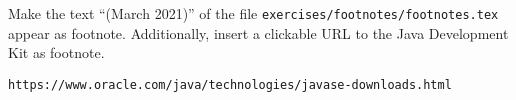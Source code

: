 Make the text \enquote{(March 2021)} of the file \texttt{exercises/footnotes/footnotes.tex} appear as footnote. Additionally, insert a clickable URL to the Java Development Kit as footnote.


\texttt{https://www.oracle.com/java/technologies/javase-downloads.html}

